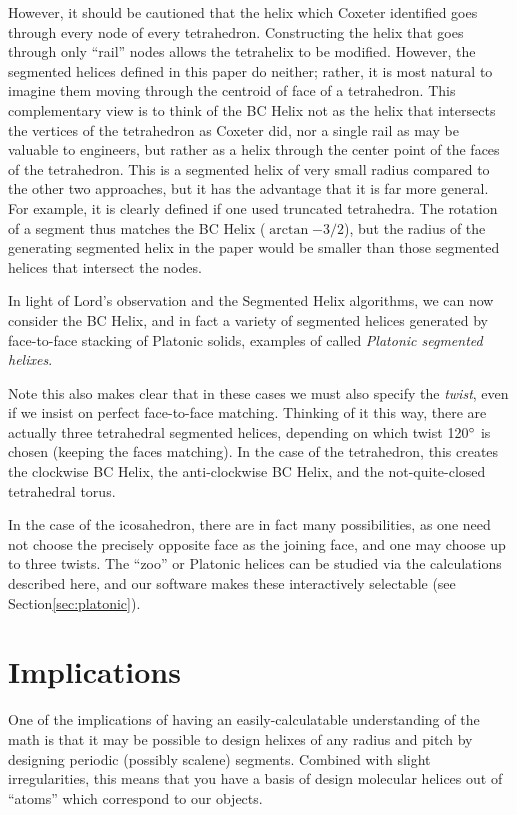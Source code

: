 \documentclass[11pt]{article}
\begin{document}
{However, it should be cautioned that the helix which Coxeter identified\cite{coxeter1985simplicial} goes through every node of every tetrahedron. Constructing the helix that goes
through only ``rail'' nodes allows the tetrahelix to be modified\cite{read2018transforming}.
However, the segmented helices defined in this paper do neither; rather, it is most natural to
imagine them moving through the centroid of face of a tetrahedron.
This complementary view is to think of the BC Helix not as the helix that
intersects the vertices of the tetrahedron as Coxeter did\cite{coxeter1985simplicial}, nor a single
rail as may be valuable to engineers\cite{read2018transforming}, but rather as a helix through
the center point of the faces of the tetrahedron. This is a segmented helix of
very small radius compared to the other two approaches, but it has
the advantage that it is far more general. For example, it is
clearly defined if one used truncated tetrahedra.
The rotation of a
segment thus matches the BC Helix ($\arctan{-3/2}$), but the radius of the
generating segmented helix in the paper would be smaller than those segmented helices that intersect the nodes.

In light of Lord's observation and the Segmented Helix algorithms, we can now
consider the BC Helix, and in fact a variety of segmented helices generated by
face-to-face stacking of Platonic solids, examples of called {\em Platonic segmented helixes}.

Note this also makes clear that in these cases we must also specify the {\em twist},
even if we insist on perfect face-to-face matching. Thinking of it this
way, there are actually three tetrahedral segmented helices, depending on which twist 120$\degree$
is chosen (keeping the faces matching). In the case of the tetrahedron,
this creates the clockwise BC Helix, the anti-clockwise BC Helix, and the
not-quite-closed tetrahedral torus.

In the case of the icosahedron, there are in fact many possibilities,
as one need not choose the precisely opposite face as the joining face, and
one may choose up to three twists. The ``zoo'' or Platonic helices
can be studied via the calculations described here, and our software
makes these interactively selectable (see Section\ref{sec:platonic}).

\section{Implications}

One of the implications of having an easily-calculatable understanding of the math
is that it may be possible to design helixes
of any radius and pitch by designing periodic (possibly scalene) segments. Combined with slight
irregularities, this means that you have a basis of design molecular helices
out of ``atoms'' which correspond to our objects.

}
\end{document}
